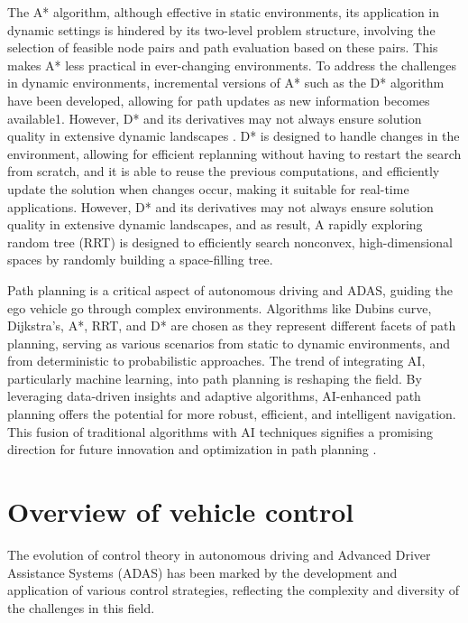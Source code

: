 The A* algorithm, although effective in static environments, its application in dynamic settings is hindered by its two-level problem structure, involving the selection of feasible node pairs and path evaluation based on these pairs. This makes A* less practical in ever-changing environments. To address the challenges in dynamic environments, incremental versions of A* such as the D* algorithm have been developed, allowing for path updates as new information becomes available1. However, D* and its derivatives may not always ensure solution quality in extensive dynamic landscapes \parencite{stentz1994optimal}. D* is designed to handle changes in the environment, allowing for efficient replanning without having to restart the search from scratch, and it is able to reuse the previous computations, and efficiently update the solution when changes occur, making it suitable for real-time applications. However, D* and its derivatives may not always ensure solution quality in extensive dynamic landscapes, and as result, A rapidly exploring random tree (RRT) is designed to efficiently search nonconvex, high-dimensional spaces by randomly building a space-filling tree. 

Path planning is a critical aspect of autonomous driving and ADAS, guiding the ego vehicle go through complex environments. Algorithms like Dubins curve, Dijkstra's, A*, RRT, and D* are chosen as they represent different facets of path planning, serving as various scenarios from static to dynamic environments, and from deterministic to probabilistic approaches. The trend of integrating AI, particularly machine learning, into path planning is reshaping the field. By leveraging data-driven insights and adaptive algorithms, AI-enhanced path planning offers the potential for more robust, efficient, and intelligent navigation. This fusion of traditional algorithms with AI techniques signifies a promising direction for future innovation and optimization in path planning \parencite{mcmahon2022survey}.

\section{Overview of vehicle control}

The evolution of control theory in autonomous driving and Advanced Driver Assistance Systems (ADAS) has been marked by the development and application of various control strategies, reflecting the complexity and diversity of the challenges in this field. 

